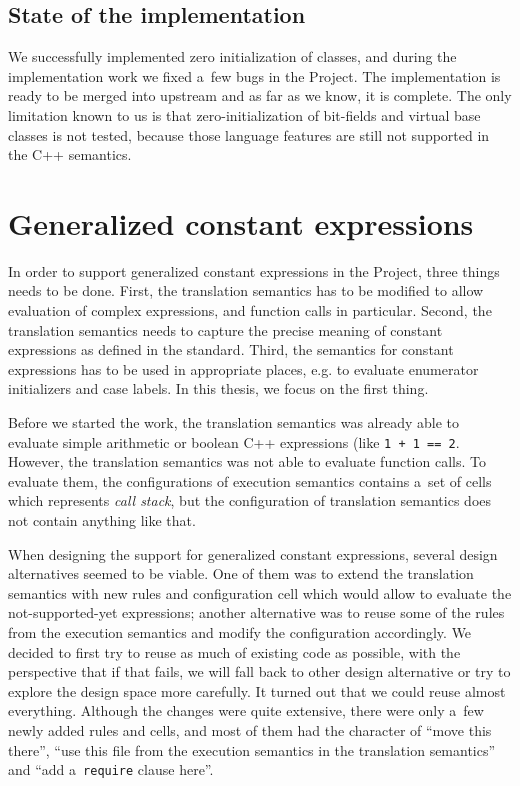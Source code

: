 \documentclass[nolot,nolof,nocover,printed]{fithesis3}
\newcommand{\Project}{Project\xspace}
\begin{document}
\subsection{State of the implementation}

We successfully implemented zero initialization of classes, and during the implementation work we fixed a~few bugs in the \Project. The implementation is ready to be merged into upstream and as far as we know, it is complete. The only limitation known to us is that zero-initialization of bit-fields and virtual base classes is not tested, because those language features are still not supported in the C++ semantics.

\section{Generalized constant expressions} \label{sec:impl:constexpr}

In order to support generalized constant expressions in the \Project, three things needs to be done. First, the translation semantics has to be modified to allow evaluation of complex expressions, and function calls in particular. Second, the translation semantics needs to capture the precise meaning of constant expressions as defined in the standard. Third, the semantics for constant expressions has to be used in appropriate places, e.g. to evaluate enumerator initializers and case labels. In this thesis, we focus on the first thing.

Before we started the work, the translation semantics was already able to evaluate simple arithmetic or boolean C++ expressions (like \lstinline|1 + 1 == 2|. However, the translation semantics was not able to evaluate function calls. To evaluate them, the configurations of execution semantics contains a~set of cells which represents \textit{call stack}, but the configuration of translation semantics does not contain anything like that.

When designing the support for generalized constant expressions, several design alternatives seemed to be viable. One of them was to extend the translation semantics with new rules and configuration cell which would allow to evaluate the not-supported-yet expressions; another alternative was to reuse some of the rules from the execution semantics and modify the configuration accordingly. We decided to first try to reuse as much of existing code as possible, with the perspective that if that fails, we will fall back to other design alternative or try to explore the design space more carefully. It turned out that we could reuse almost everything. Although the changes were quite extensive, there were only a~few newly added rules and cells, and most of them had the character of \enquote{move this there}, \enquote{use this file from the execution semantics in the translation semantics} and \enquote{add a~\lstinline|require| clause here}.
\end{document}
